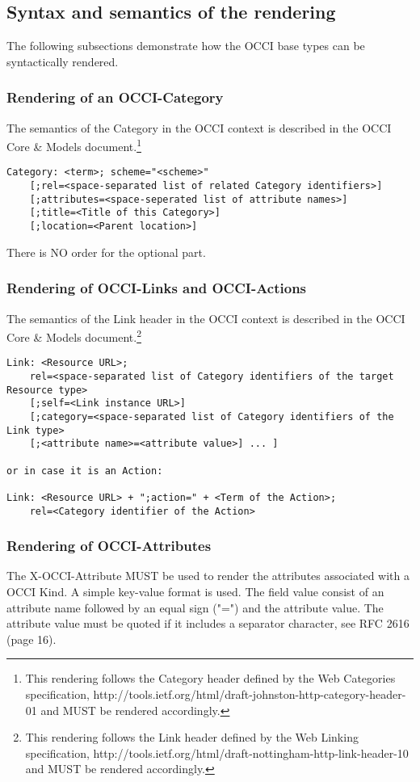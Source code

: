 \documentclass[10pt,a4paper]{article}
\begin{document}
\subsection{Syntax and semantics of the rendering}
\label{sec:syntax}
The following subsections demonstrate how the OCCI base types can be
syntactically rendered.

\subsubsection{Rendering of an OCCI-Category}

The semantics of the Category in the OCCI context is described in the
OCCI Core \& Models document.\footnote{This rendering follows the
  Category header defined by the Web Categories specification,
  http://tools.ietf.org/html/draft-johnston-http-category-header-01
  and MUST be rendered accordingly.}

\begin{verbatim}
Category: <term>; scheme="<scheme>"
    [;rel=<space-separated list of related Category identifiers>]
    [;attributes=<space-seperated list of attribute names>]
    [;title=<Title of this Category>]    
    [;location=<Parent location>]
\end{verbatim}
There is NO order for the optional part.

\subsubsection{Rendering of OCCI-Links and OCCI-Actions}
The semantics of the Link header in the OCCI context is described in
the OCCI Core \& Models document.\footnote{This rendering follows the
  Link header defined by the Web Linking specification,
  http://tools.ietf.org/html/draft-nottingham-http-link-header-10 and
  MUST be rendered accordingly.}

\begin{verbatim}
Link: <Resource URL>;
    rel=<space-separated list of Category identifiers of the target Resource type>
    [;self=<Link instance URL>]
    [;category=<space-separated list of Category identifiers of the Link type>
    [;<attribute name>=<attribute value>] ... ]

or in case it is an Action:

Link: <Resource URL> + ";action=" + <Term of the Action>;
    rel=<Category identifier of the Action>
\end{verbatim}

\subsubsection{Rendering of OCCI-Attributes}
The X-OCCI-Attribute MUST be used to render the attributes associated
with a OCCI Kind. A simple key-value format is used. The field value
consist of an attribute name followed by an equal sign ("=") and the
attribute value. The attribute value must be quoted if it includes a
separator character, see RFC 2616 (page 16).
\end{document}
